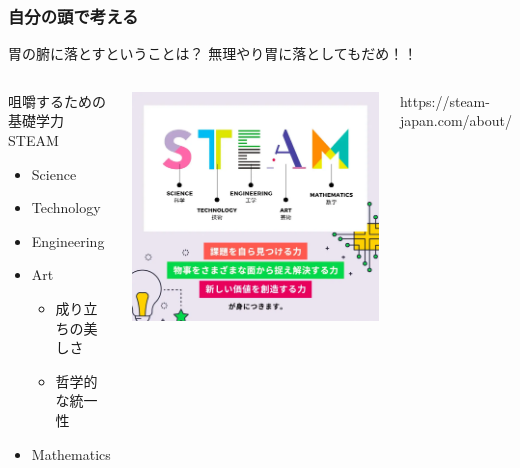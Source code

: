 \documentclass[12pt, dvipdfmx]{beamer}
\begin{document}
\begin{frame}
    \frametitle{自分の頭で考える}
        \begin{alertblock}{胃の腑に落とすということは？}
            無理やり胃に落としてもだめ！！

            \begin{columns}[T, onlytextwidth]
                
                \begin{block}{咀嚼するための基礎学力}
                    STEAM 
                    \begin{itemize}
                        \item Science
                        \item Technology
                        \item Engineering
                        \item \alert{Art}
                        \begin{itemize}
                            \item<2-> 成り立ちの美しさ
                            \item<2-> 哲学的な統一性 
                        \end{itemize}
                        \item Mathematics
                    \end{itemize}
                \end{block}
                    \centering
                        \includegraphics[width=\textwidth]{steam.png}

                        \footnotesize{https://steam-japan.com/about/}
            \end{columns}
        \end{alertblock}
\end{frame}
\end{document}
